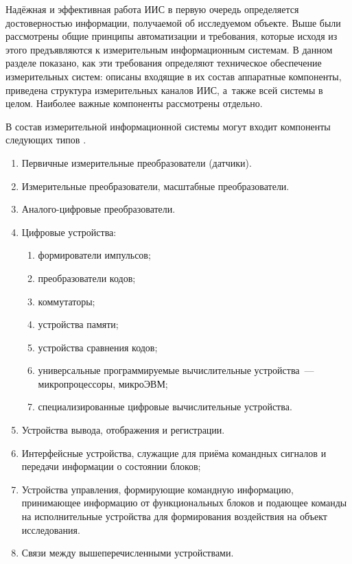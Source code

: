 \documentclass[a4paper, 14pt, titlepage]{extarticle}
\begin{document}
  Надёжная и эффективная работа ИИС в первую очередь определяется достоверностью информации,
  получаемой об исследуемом объекте. Выше были рассмотрены общие принципы автоматизации и
  требования, которые исходя из этого предъявляются к измерительным информационным системам.
  В данном разделе показано, как эти требования определяют техническое обеспечение измерительных систем: описаны входящие в их
  состав аппаратные компоненты, приведена структура измерительных каналов ИИС, а~также всей системы
  в целом. Наиболее важные компоненты рассмотрены отдельно.


  В состав измерительной информационной системы могут входит компоненты следующих типов
  \cite[с.~15]{volkov-iis}.
  \begin{enumerate}
    \item Первичные измерительные преобразователи (датчики).
    \item Измерительные преобразователи, масштабные преобразователи.
    \item Аналого-цифровые преобразователи.
    \item Цифровые устройства:
      \begin{enumerate}
        \item формирователи импульсов;
        \item преобразователи кодов;
        \item коммутаторы;
        \item устройства памяти;
        \item устройства сравнения кодов;
        \item универсальные программируемые вычислительные устройства~--- микропроцессоры, микроЭВМ;
        \item специализированные цифровые вычислительные устройства.
      \end{enumerate}
    \item Устройства вывода, отображения и регистрации.
    \item Интерфейсные устройства, служащие для приёма командных сигналов и передачи информации о
      состоянии блоков;
    \item Устройства управления, формирующие командную информацию, принимающее информацию от
      функциональных блоков и подающее команды на исполнительные устройства для формирования
      воздействия на объект исследования.
    \item Связи между вышеперечисленными устройствами.
  \end{enumerate}
\end{document}
